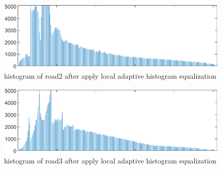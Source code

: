 \documentclass[
	12pt, %
]{fphw}
\begin{document}
\begin{figure}[H]
 
	\centering
	\includegraphics[width=1\columnwidth]{T2/result/hist2_local.png} 
	\caption{histogram of road2 after apply local adaptive histogram equalization}
	\label{fig20}
\end{figure}
\begin{figure}[H]
 
	\centering
	\includegraphics[width=1\columnwidth]{T2/result/hist3_local.png} 
	\caption{histogram of road3 after apply local adaptive histogram equalization}
	\label{fig21}
\end{figure}
\end{document}
